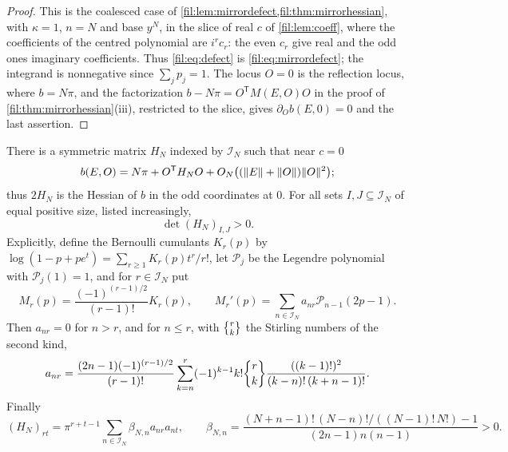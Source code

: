 \begin{proof}
This is the coalesced case of \cref{fil:lem:mirrordefect,fil:thm:mirrorhessian}, with $\kappa=1$, $n=N$ and base $y^N$, in
the slice of real $c$ of \cref{fil:lem:coeff}, where the coefficients of the centred polynomial are $i^rc_r$: the even
$c_r$ give real and the odd ones imaginary coefficients. Thus \eqref{fil:eq:defect} is \eqref{fil:eq:mirrordefect}; the
integrand is nonnegative since $\sum_jp_j=1$. The locus $O=0$ is the reflection locus, where $b=N\pi$, and the
factorization $b-N\pi=O^{\mathsf T}M(E,O)O$ in the proof of \cref{fil:thm:mirrorhessian}\textup{(iii)}, restricted to the
slice, gives $\partial_Ob(E,0)=0$ and the last assertion.
\end{proof}

\begin{theorem}\label{fil:thm:hessian}
There is a symmetric matrix $H_N$ indexed by $\mathcal I_N$ such that near $c=0$
\[
 b(E,O)=N\pi+O^{\mathsf T}H_NO+O_N\bigl((\lVert E\rVert+\lVert O\rVert)\lVert O\rVert^2\bigr);
\]
thus $2H_N$ is the Hessian of $b$ in the odd coordinates at $0$. For all sets $I,J\subseteq\mathcal I_N$ of equal positive
size, listed increasingly,
\[
 \det(H_N)_{I,J}>0 .
\]
Explicitly, define the Bernoulli cumulants $K_r(p)$ by $\log(1-p+pe^t)=\sum_{r\ge1}K_r(p)t^r/r!$, let $\mathcal P_j$ be the
Legendre polynomial with $\mathcal P_j(1)=1$, and for $r\in\mathcal I_N$ put
\[
 M_r(p)=\frac{(-1)^{(r-1)/2}}{(r-1)!}K_r(p),\qquad M_r'(p)=\sum_{n\in\mathcal I_N}a_{nr}\mathcal P_{n-1}(2p-1).
\]
Then $a_{nr}=0$ for $n>r$, and for $n\le r$, with $\filStir rk$ the Stirling numbers of the second kind,
\[
 a_{nr}=\frac{(2n-1)(-1)^{(r-1)/2}}{(r-1)!}\sum_{k=n}^r(-1)^{k-1}k!\filStir rk\frac{((k-1)!)^2}{(k-n)!\,(k+n-1)!}.
\]
Finally
\begin{equation}\label{fil:eq:hessfactor}
 (H_N)_{rt}=\pi^{r+t-1}\sum_{n\in\mathcal I_N}\beta_{N,n}a_{nr}a_{nt},\qquad
 \beta_{N,n}=\frac{(N+n-1)!\,(N-n)!/((N-1)!\,N!)-1}{(2n-1)n(n-1)}>0 .
\end{equation}
\end{theorem}

